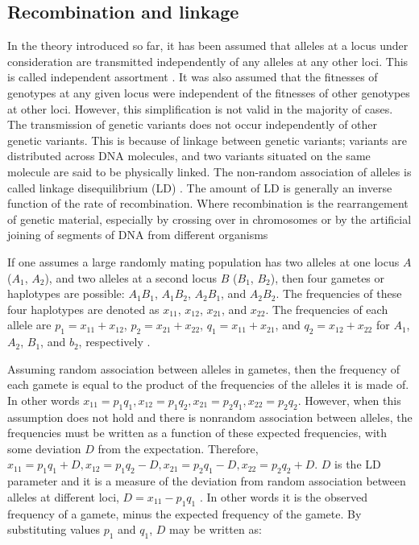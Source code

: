 \subsection{Recombination and linkage}

In the theory introduced so far, it has been assumed that alleles at a locus under consideration are transmitted independently of any alleles at any other loci.
This is called independent assortment \parencite{Hedrick2010}.
It was also assumed that the fitnesses of genotypes at any given locus were independent of the fitnesses of other genotypes at other loci.
However, this simplification is not valid in the majority of cases.
The transmission of genetic variants does not occur independently of other genetic variants.
This is because of linkage between genetic variants; variants are distributed across DNA molecules, and two variants situated on the same molecule are said to be physically linked.
The non-random association of alleles is called linkage disequilibrium (LD) \parencite{Lewontin1960}.
The amount of LD is generally an inverse function of the rate of recombination. Where recombination is the rearrangement of genetic material, especially by crossing over in chromosomes or by the artificial joining of segments of DNA from different organisms 

If one assumes a large randomly mating population has two alleles at one locus $A$ ($A_1$, $A_2$), and two alleles at a second locus $B$ ($B_1$, $B_2$), then four gametes or haplotypes are possible: $A_1B_1$, $A_1B_2$, $A_2B_1$, and $A_2B_2$.
The frequencies of these four haplotypes are denoted as $x_{11}$, $x_{12}$, $x_{21}$, and $x_{22}$.
The frequencies of each allele are $p_1=x_{11}+x_{12}$, $p_2=x_{21}+x_{22}$, $q_1=x_{11}+x_{21}$, and $q_2=x_{12}+x_{22}$ for $A_1$, $A_2$, $B_1$, and $b_2$, respectively \parencite{Lewontin1960}.

Assuming random association between alleles in gametes, then the frequency of each gamete is equal to the product of the frequencies of the alleles it is made of.
In other words $x_{11}=p_1q_1, x_{12}=p_1q_2, x_{21}=p_2q_1, x_{22}=p_2q_2$.
However, when this assumption does not hold and there is nonrandom association between alleles, the frequencies must be written as a function of these expected frequencies, with some deviation $D$ from the expectation.
Therefore, $x_{11}=p_1q_1+D, x_{12}=p_1q_2-D, x_{21}=p_2q_1-D, x_{22}=p_2q_2+D$.
$D$ is the LD parameter and it is a measure of the deviation from random association between alleles at different loci, $D = x_{11} - p_1q_1$ \parencite{Lewontin1960}.
In other words it is the observed frequency of a gamete, minus the expected frequency of the gamete.
By substituting values $p_1$ and $q_1$, $D$ may be written as:

